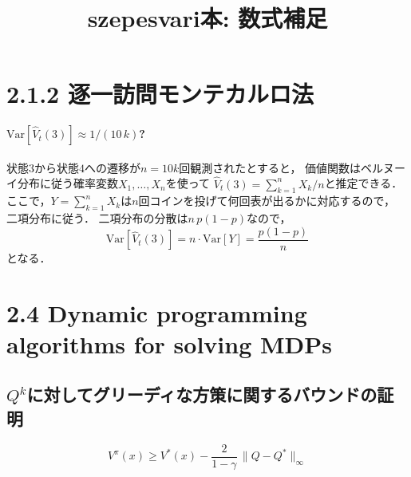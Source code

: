 \documentclass{jsarticle}
\date{}
\title{szepesvari本: 数式補足}
\newcommand{\st}{x}
\newcommand{\Var}[1]{{\mathrm{Var}}\left[#1\right]}
\begin{document}
\maketitle

\section*{2.1.2 逐一訪問モンテカルロ法}

\paragraph{$\Var{\hat{V}_t(3)} \approx 1/(10\,k)$?}
状態$3$から状態$4$への遷移が$n = 10k$回観測されたとすると，
価値関数はベルヌーイ分布に従う確率変数$X_1, \ldots, X_n$を使って
$\hat{V}_t(3) = \sum_{k=1}^n X_k / n$と推定できる．
ここで，$Y = \sum_{k=1}^n X_k$は$n$回コインを投げて何回表が出るかに対応するので，
二項分布に従う．
二項分布の分散は$n\,p(1-p)$なので，
\begin{equation}
\Var{\hat{V}_t(3)} = n \cdot \Var{Y} = \frac{p(1-p)}{n}
\end{equation}
となる．

\section*{2.4 Dynamic programming algorithms for solving MDPs}

\subsection*{$Q^{k}$に対してグリーディな方策に関するバウンドの証明}
\begin{equation}
V^\pi(\st) \ge V^*(\st) - \frac{2}{1-\gamma} \, \|Q-Q^*\|_{\infty}
\end{equation}
\end{document}
